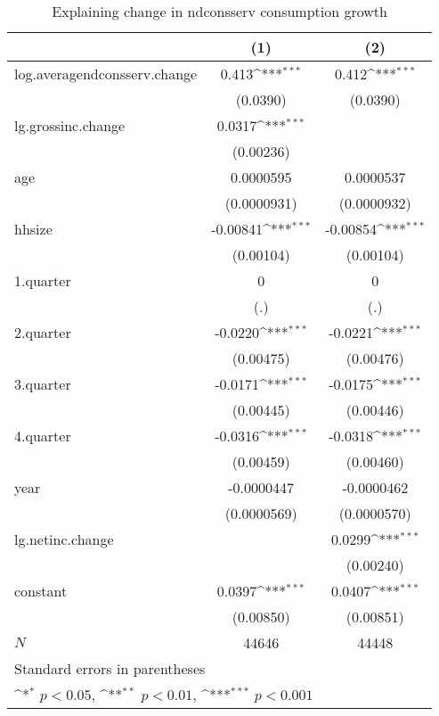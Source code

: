 \begin{table}[htbp]\centering
\def\sym#1{\ifmmode^{#1}\else\(^{#1}\)\fi}
\caption{\label{tab:logndconsserv-deltacons} Explaining change in ndconsserv consumption growth}
\begin{tabular}{l*{2}{c}}
\hline\hline
            &\multicolumn{1}{c}{(1)}         &\multicolumn{1}{c}{(2)}         \\
\hline
log.averagendconsserv.change&       0.413\sym{***}&       0.412\sym{***}\\
            &    (0.0390)         &    (0.0390)         \\
lg.grossinc.change&      0.0317\sym{***}&                     \\
            &   (0.00236)         &                     \\
age         &   0.0000595         &   0.0000537         \\
            & (0.0000931)         & (0.0000932)         \\
hhsize      &    -0.00841\sym{***}&    -0.00854\sym{***}\\
            &   (0.00104)         &   (0.00104)         \\
1.quarter   &           0         &           0         \\
            &         (.)         &         (.)         \\
2.quarter   &     -0.0220\sym{***}&     -0.0221\sym{***}\\
            &   (0.00475)         &   (0.00476)         \\
3.quarter   &     -0.0171\sym{***}&     -0.0175\sym{***}\\
            &   (0.00445)         &   (0.00446)         \\
4.quarter   &     -0.0316\sym{***}&     -0.0318\sym{***}\\
            &   (0.00459)         &   (0.00460)         \\
year        &  -0.0000447         &  -0.0000462         \\
            & (0.0000569)         & (0.0000570)         \\
lg.netinc.change&                     &      0.0299\sym{***}\\
            &                     &   (0.00240)         \\
constant    &      0.0397\sym{***}&      0.0407\sym{***}\\
            &   (0.00850)         &   (0.00851)         \\
\hline
\(N\)       &       44646         &       44448         \\
\hline\hline
\multicolumn{3}{l}{\footnotesize Standard errors in parentheses}\\
\multicolumn{3}{l}{\footnotesize \sym{*} \(p<0.05\), \sym{**} \(p<0.01\), \sym{***} \(p<0.001\)}\\
\end{tabular}
\end{table}
